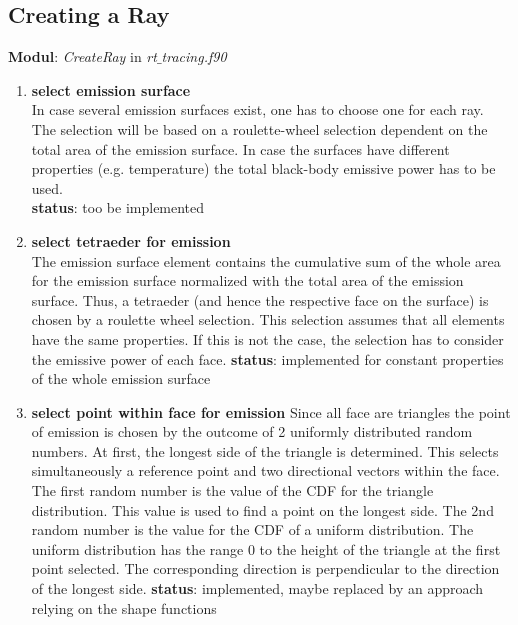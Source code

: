 \documentclass[a4paper,10pt]{scrartcl}
\begin{document}
\subsection{Creating a Ray}
\textbf{Modul}: \textit{CreateRay} in \textit{rt$\_$tracing.f90} 
\begin{enumerate}
 \item \textbf{select emission surface} \\
       In case several emission surfaces exist, one has to choose one for each ray. The selection will be based on a roulette-wheel selection dependent on the total area of the emission surface. In case the surfaces have different properties (e.g. temperature) the total black-body emissive power has to be used.\\
       \textbf{status}: too be implemented

 \item \textbf{select tetraeder for emission} \\
       The emission surface element contains the cumulative sum of the whole area for the emission surface normalized with the total area of the emission surface. Thus, a tetraeder (and hence the respective face on the surface) is chosen by a roulette wheel selection. This selection assumes that all elements have the same properties. If this is not the case, the selection has to consider the emissive power of each face.
       \textbf{status}: implemented for constant properties of the whole emission surface
 
 \item \textbf{select point within face for emission}
       Since all face are triangles the point of emission is chosen by the outcome of 2 uniformly distributed random numbers. At first, the longest side of the triangle is determined. This selects simultaneously a reference point and two directional vectors within the face. The first random number is the value of the CDF for the triangle distribution. This value is used to find a point on the longest side. The 2nd random number is the value for the CDF of a uniform distribution. The uniform distribution has the range $0$ to the height of the triangle at the first point selected. The corresponding direction is perpendicular to the direction of the longest side.
       \textbf{status}: implemented, maybe replaced by an approach relying on the shape functions
       

\end{enumerate}
\end{document}

